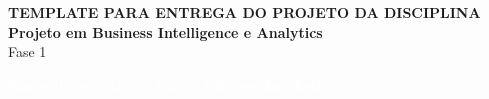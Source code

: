 \documentclass[oneside,12pt,a4paper]{report}
\begin{document}
\begin{minipage}{16cm}
\centering
\begin{center}
{\textbf{TEMPLATE PARA ENTREGA DO PROJETO DA DISCIPLINA}}\\
{\textbf{Projeto em Business Intelligence e Analytics}}\\
{Fase 1}
\end{center}
\end{minipage}
\vspace{0.5cm}

\colorbox{pucrs-dark-blue}{\textcolor{white}{\textbf{Nome do estudante: Victor Moraes Zucchetti}}}










%

\end{document}

